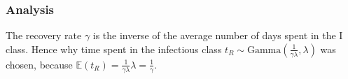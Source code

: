 \documentclass[11pt]{article}
\begin{document}
\subsubsection*{Analysis}
The recovery rate $\gamma$ is the inverse of the average number of days spent in the I class. Hence why time spent in the infectious class $t_R \sim \text{Gamma}(\frac{1}{\gamma\lambda}, \lambda)$ was chosen, because $\mathbb{E}(t_R)=\frac{1}{\gamma\lambda} \lambda=\frac{1}{\gamma}$.
\end{document}
